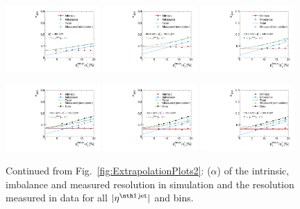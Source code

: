 \begin{figure}[ht]
    \includegraphics[width=0.32\textwidth]{figures/resolution/results/JER_for_3_eta_bin_12_pTGamma_bin_all_contributions_PFCHS_RMS99_mc.pdf}
    \includegraphics[width=0.32\textwidth]{figures/resolution/results/JER_for_4_eta_bin_4_pTGamma_bin_all_contributions_PFCHS_RMS99_mc.pdf}
    \includegraphics[width=0.32\textwidth]{figures/resolution/results/JER_for_4_eta_bin_5_pTGamma_bin_all_contributions_PFCHS_RMS99_mc.pdf}

    \includegraphics[width=0.32\textwidth]{figures/resolution/results/JER_for_4_eta_bin_6_pTGamma_bin_all_contributions_PFCHS_RMS99_mc.pdf}
    \includegraphics[width=0.32\textwidth]{figures/resolution/results/JER_for_4_eta_bin_7_pTGamma_bin_all_contributions_PFCHS_RMS99_mc.pdf}
    \includegraphics[width=0.32\textwidth]{figures/resolution/results/JER_for_4_eta_bin_8_pTGamma_bin_all_contributions_PFCHS_RMS99_mc.pdf}
  \caption{Continued from Fig.~\ref{fig:ExtrapolationPlots2}: \jer($\alpha$) of the intrinsic, imbalance and measured resolution in simulation and the resolution measured in data for all $|\etafirstjet|$ and \ptgamma bins.}
  \label{fig:ExtrapolationPlots3}
\end{figure}

